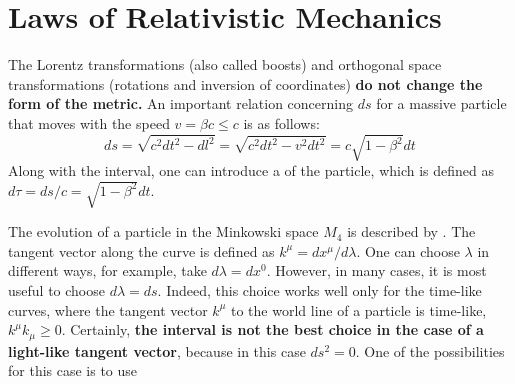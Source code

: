 \section{Laws of Relativistic Mechanics}
The Lorentz transformations (also called boosts) and orthogonal space transformations (rotations and inversion of coordinates) \textbf{do not change the form of the metric.} An important relation concerning $ds$ for a massive particle that moves with the speed $v=\beta c\leq c$ is as follows:
\begin{equation}
d s=\sqrt{c^{2} d t^{2}-d l^{2}}=\sqrt{c^{2} d t^{2}-v^{2} d t^{2}}=c \sqrt{1-\beta^{2}} d t
\end{equation}
Along with the interval, one can introduce a \textbf{} of the particle, which is defined as $d \tau=d s / c=\sqrt{1-\beta^{2}} d t$.

The evolution of a particle in the Minkowski space $M_{4}$ is described by . The tangent vector along the curve is defined as $k^{\mu}=d x^{\mu} / d \lambda .$ One can choose $\lambda$ in different ways, for example, take $d \lambda=d x^{0} .$ However, in many cases, it is most useful to choose $d \lambda=d s .$ Indeed, this choice works well only for the time-like curves, where the tangent vector $k^{\mu}$ to the world line of a particle is time-like, $k^{\mu} k_{\mu} \geq 0 .$ Certainly, \textbf{the interval is not the best choice in the case of a light-like tangent vector}, because in this case $d s^{2}=0 .$ One of the possibilities for this case is to use 

